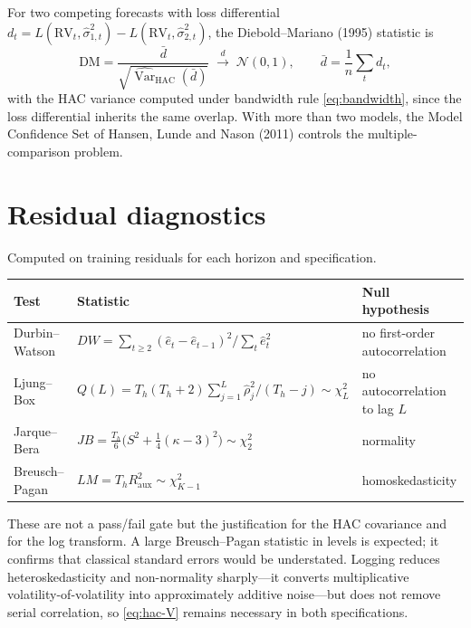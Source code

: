 \documentclass[11pt,a4paper]{article}
\newcommand{\RV}{\mathrm{RV}}
\newcommand{\Var}{\operatorname{Var}}
\begin{document}
For two competing forecasts with loss differential
$d_t=L(\RV_t,\hat\sigma^{2}_{1,t})-L(\RV_t,\hat\sigma^{2}_{2,t})$, the Diebold--Mariano
(1995) statistic is
\begin{equation}
  \mathrm{DM}=\frac{\bar d}{\sqrt{\widehat{\Var}_{\mathrm{HAC}}(\bar d)}}
  \;\xrightarrow{d}\;\mathcal{N}(0,1),
  \qquad \bar d=\frac{1}{n}\sum_t d_t,
  \label{eq:dm}
\end{equation}
with the HAC variance computed under bandwidth rule \eqref{eq:bandwidth}, since the loss
differential inherits the same overlap. With more than two models, the Model Confidence Set
of Hansen, Lunde and Nason (2011) controls the multiple-comparison problem.

\section{Residual diagnostics}
\label{sec:diagnostics}

Computed on training residuals for each horizon and specification.

\begin{center}
\begin{tabular}{@{}llp{4.4cm}@{}}
\toprule
Test & Statistic & Null hypothesis \\
\midrule
Durbin--Watson  & $DW=\sum_{t\ge2}(\hat e_t-\hat e_{t-1})^{2}\big/\sum_t\hat e_t^{2}$ & no first-order autocorrelation \\
Ljung--Box      & $Q(L)=T_h(T_h+2)\sum_{j=1}^{L}\hat\rho_j^{2}/(T_h-j)\sim\chi^{2}_{L}$ & no autocorrelation to lag $L$ \\
Jarque--Bera    & $JB=\tfrac{T_h}{6}\bigl(S^{2}+\tfrac{1}{4}(\kappa-3)^{2}\bigr)\sim\chi^{2}_{2}$ & normality \\
Breusch--Pagan  & $LM=T_h R^{2}_{\text{aux}}\sim\chi^{2}_{K-1}$ & homoskedasticity \\
\bottomrule
\end{tabular}
\end{center}

These are not a pass/fail gate but the justification for the HAC covariance and for the log
transform. A large Breusch--Pagan statistic in levels is expected; it confirms that
classical standard errors would be understated. Logging reduces heteroskedasticity and
non-normality sharply---it converts multiplicative volatility-of-volatility into
approximately additive noise---but does not remove serial correlation, so
\eqref{eq:hac-V} remains necessary in both specifications.
\end{document}
